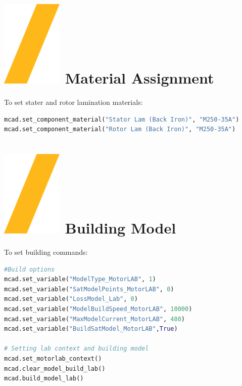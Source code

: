 \documentclass[landscape]{article}
\begin{document}
\begin{multicols}{3}
\section{\includegraphics[height=\fontcharht\font`\S]{slash.png} Material Assignment}
To set stater and rotor lamination materials:
\begin{lstlisting}[language=Python]
mcad.set_component_material("Stator Lam (Back Iron)", "M250-35A")
mcad.set_component_material("Rotor Lam (Back Iron)", "M250-35A")
\end{lstlisting}

\section{\includegraphics[height=\fontcharht\font`\S]{slash.png} Building Model}
To set building commands:
\begin{lstlisting}[language=Python]
#Build options
mcad.set_variable("ModelType_MotorLAB", 1)
mcad.set_variable("SatModelPoints_MotorLAB", 0)
mcad.set_variable("LossModel_Lab", 0)
mcad.set_variable("ModelBuildSpeed_MotorLAB", 10000)
mcad.set_variable("MaxModelCurrent_MotorLAB", 480)
mcad.set_variable("BuildSatModel_MotorLAB",True)

# Setting lab context and building model
mcad.set_motorlab_context()
mcad.clear_model_build_lab()
mcad.build_model_lab()
\end{lstlisting}

\end{multicols}
\end{document}
